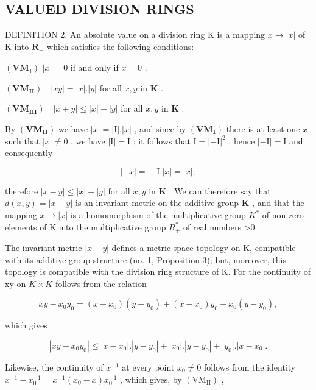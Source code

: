 \subsection{VALUED DIVISION RINGS}

DEFINITION 2. An absolute value on a division ring K is a mapping \(x \to |x|\) of K into \(\mathbf{R}_{+}\) which satisfies the following conditions:

\((\mathbf{VM}_{\mathbf{I}})\) \(|x| = 0\) if and only if \(x = 0\) .

\((\mathbf{VM}_{\mathbf{II}})\quad |xy| = |x|.|y|\) for all \(x,y\) in \(\mathbf{K}\) .

\((\mathbf{VM}_{\mathbf{III}})\quad |x + y|\leqslant |x| + |y|\) for all \(x,y\) in \(\mathbf{K}\) .

By \((\mathbf{VM}_{\mathbf{II}})\) we have \(|x| = |\mathrm{I}|.|x|\) , and since by \((\mathbf{VM}_{\mathbf{I}})\) there is at least one \(x\) such that \(|x| \neq 0\) , we have \(|\mathrm{I}| = \mathrm{I}\) ; it follows that \(\mathrm{I} = |- \mathrm{I}|^2\) , hence \(|- \mathrm{I}| = \mathrm{I}\) and consequently

\[
| - x | = | - \mathrm{I} | | x | = | x |;
\]

therefore \(|x - y| \leqslant |x| + |y|\) for all \(x, y\) in \(\mathbf{K}\) . We can therefore say that \(d(x, y) = |x - y|\) is an invariant metric on the additive group \(\mathbf{K}\) , and that the mapping \(x \to |x|\) is a homomorphism of the multiplicative group \(K^{*}\) of non-zero elements of K into the multiplicative group \(R_{+}^{*}\) of real numbers \textgreater0.

The invariant metric \(|x - y|\) defines a metric space topology on K, compatible with its additive group structure (no. 1, Proposition 3); but, moreover, this topology is compatible with the division ring structure of K. For the continuity of xy on \(K \times K\) follows from the relation

\[
x y - x _ {0} y _ {0} = (x - x _ {0}) (y - y _ {0}) + (x - x _ {0}) y _ {0} + x _ {0} (y - y _ {0}),
\]

which gives

\[
\left| x y - x _ {0} y _ {0} \right| \leqslant \left| x - x _ {0} \right|. \left| y - y _ {0} \right| + \left| x _ {0} \right|. \left| y - y _ {0} \right| + \left| y _ {0} \right|. \left| x - x _ {0} \right|.
\]

Likewise, the continuity of \(x^{-1}\) at every point \(x_{0} \neq 0\) follows from the identity \(x^{-1} - x_{0}^{-1} = x^{-1} (x_{0} - x)x_{0}^{-1}\) , which gives, by \((\mathrm{VM}_{\mathrm{II}})\) ,

